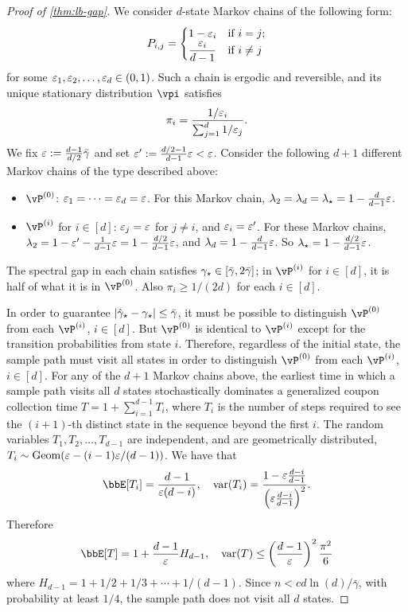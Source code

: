 \begin{proof}[Proof of \cref{thm:lb-gap}]
  We consider $d$-state Markov chains of the following form:
  \[
    P_{i,j} =
    \begin{cases}
      1-\varepsilon_i & \text{if $i = j$} ; \\
      \displaystyle\frac{\varepsilon_i}{d-1} & \text{if $i \neq j$}
    \end{cases}
  \]
  for some $\varepsilon_1, \varepsilon_2, \dotsc, \varepsilon_d \in (0,1)$.
  Such a chain is ergodic and reversible, and its unique stationary
  distribution $\vpi$ satisfies
  \[
    \pi_i = \frac{1/\varepsilon_i}{\sum_{j=1}^d 1/\varepsilon_j}
    .
  \]
  We fix $\varepsilon := \frac{d-1}{d/2}\bar\gamma$ and set $\varepsilon' :=
  \frac{d/2-1}{d-1} \varepsilon < \varepsilon$.
  Consider the following $d+1$ different Markov chains of the type
  described above:
  \begin{itemize}
    \item
      $\vP^{(0)}$: $\varepsilon_1 = \dotsb = \varepsilon_d = \varepsilon$.
      For this Markov chain, $\lambda_2 = \lambda_d = \lambda_{\star} =
      1-\frac{d}{d-1}\varepsilon$.

    \item
      $\vP^{(i)}$ for $i \in [d]$: $\varepsilon_j = \varepsilon$ for $j \neq i$,
      and $\varepsilon_i = \varepsilon'$.
      For these Markov chains, $\lambda_2 = 1 - \varepsilon' -
      \frac{1}{d-1}\varepsilon = 1 - \frac{d/2}{d-1} \varepsilon$,
      and $\lambda_d = 1 - \frac{d}{d-1} \varepsilon$.
      So $\lambda_{\star} = 1-\frac{d/2}{d-1} \varepsilon$.

  \end{itemize}
  The spectral gap in each chain satisfies $\gamma_{\star} \in
  [\bar\gamma,2\bar\gamma]$; in $\vP^{(i)}$ for $i \in [d]$, it is half
  of what it is in $\vP^{(0)}$.
  Also $\pi_i \geq 1/(2d)$ for each $i \in [d]$.

  In order to guarantee $|\hat\gamma_{\star} - \gamma_{\star}| \leq \bar\gamma$, it must
  be possible to distinguish $\vP^{(0)}$ from each $\vP^{(i)}$,
  $i\in[d]$.
  But $\vP^{(0)}$ is identical to $\vP^{(i)}$ except for the transition
  probabilities from state $i$.
  Therefore, regardless of the initial state, the sample path must
  visit all states in order to distinguish $\vP^{(0)}$ from each
  $\vP^{(i)}$, $i \in [d]$.
  For any of the $d+1$ Markov chains above, the earliest time in which
  a sample path visits all $d$ states
  stochastically dominates a generalized coupon collection time $T = 1 +
  \sum_{i=1}^{d-1} T_i$, where $T_i$ is the number of steps required to
  see the $(i+1)$-th distinct state in the sequence beyond the first
  $i$.
  The random variables $T_1,T_2,\dotsc,T_{d-1}$ are independent, and are
  geometrically distributed, $T_i \sim \operatorname{Geom}(\varepsilon -
  (i-1)\varepsilon/(d-1))$.
  We have that
  \[
    \bbE[T_i] = \frac{d-1}{\veps(d-i)} , \quad
    \var(T_i) = \frac{1 - \veps \frac{d-i}{d-1}}{%
      \Parens{ \veps \frac{d-i}{d-1} }^2
    }
    .
  \]
  Therefore
  \[
    \bbE[T] = 1 + \frac{d-1}{\veps} H_{d-1} , \quad
    \var(T) \leq \Parens{ \frac{d-1}{\veps} }^2 \frac{\pi^2}{6} 
  \]
  where $H_{d-1} = 1 + 1/2 + 1/3 + \dotsb + 1/(d-1)$.
  Since $n < c d\ln(d) / \bar\gamma$, with probability at least $1/4$,
  the sample path does not visit all $d$ states.
\end{proof}


